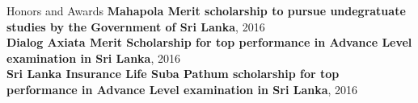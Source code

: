 \documentclass{resume} %
\begin{document}


\begin{rSection}{Honors and Awards}
    {\bf Mahapola Merit scholarship to pursue undegratuate studies by the Government of Sri Lanka}, \hfill {2016}\\

    {\bf Dialog Axiata Merit Scholarship for top performance in Advance Level examination in Sri Lanka}, \hfill {2016}\\

    {\bf Sri Lanka Insurance Life Suba Pathum scholarship for top performance in Advance Level examination in Sri Lanka}, \hfill {2016}\\
\end{rSection} 
\end{document}
